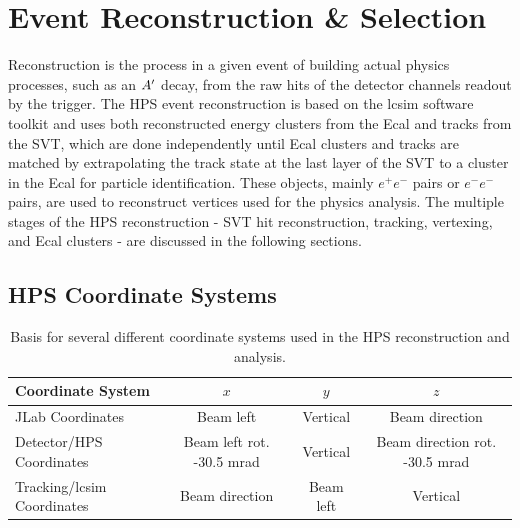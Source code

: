 \chapter{Event Reconstruction \& Selection}\label{chap:reconstruction}

Reconstruction is the process in a given event of building actual physics processes, such as an $A^\prime$ decay, from the raw hits of the detector channels readout by the trigger. The HPS event reconstruction is based on the lcsim software toolkit \cite{Graf_2011} and uses both reconstructed energy clusters from the Ecal and tracks from the SVT, which are done independently until Ecal clusters and tracks are matched by extrapolating the track state at the last layer of the SVT to a cluster in the Ecal for particle identification. These objects, mainly $e^+e^-$ pairs or $e^-e^-$ pairs, are used to reconstruct vertices used for the physics analysis. The multiple stages of the HPS reconstruction - SVT hit reconstruction, tracking, vertexing, and Ecal clusters - are discussed in the following sections.

\section{HPS Coordinate Systems}\label{sec:coordinates}

\begin{table}[!hb] 
\centering
\begin{tabular}{lccc}
   \toprule    
    Coordinate System & $x$ & $y$ & $z$ \\
    \midrule
     JLab Coordinates & Beam left & Vertical & Beam direction \\
     Detector/HPS Coordinates & Beam left rot. -30.5 mrad & Vertical & Beam direction rot. -30.5 mrad \\
     Tracking/lcsim Coordinates & Beam direction & Beam left & Vertical \\
     \bottomrule
\end{tabular}
\caption{Basis for several different coordinate systems used in the HPS reconstruction and analysis.}
\label{table:coordinates}
\end{table}

